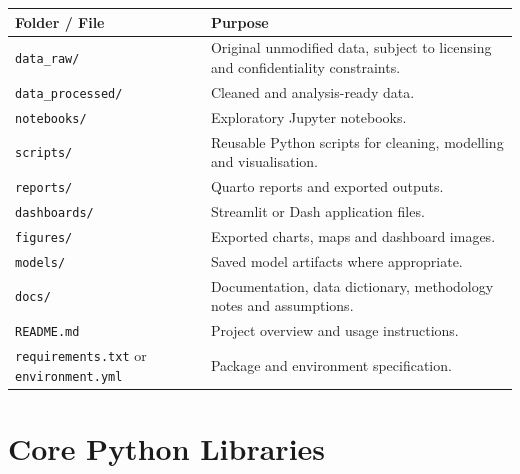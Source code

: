 \documentclass[
  a4paper,
]{article}
\newcounter{none} %
\begin{document}
{\def\LTcaptype{none} %
\begin{longtable}[]{@{}
  >{\raggedright\arraybackslash}p{}
  >{\raggedright\arraybackslash}p{}@{}}
\toprule\noalign{}
\begin{minipage}[b]{\linewidth}\raggedright
Folder / File
\end{minipage} & \begin{minipage}[b]{\linewidth}\raggedright
Purpose
\end{minipage} \\
\midrule\noalign{}
\endhead
\bottomrule\noalign{}
\endlastfoot
\texttt{data\_raw/} & Original unmodified data, subject to licensing and
confidentiality constraints. \\
\texttt{data\_processed/} & Cleaned and analysis-ready data. \\
\texttt{notebooks/} & Exploratory Jupyter notebooks. \\
\texttt{scripts/} & Reusable Python scripts for cleaning, modelling and
visualisation. \\
\texttt{reports/} & Quarto reports and exported outputs. \\
\texttt{dashboards/} & Streamlit or Dash application files. \\
\texttt{figures/} & Exported charts, maps and dashboard images. \\
\texttt{models/} & Saved model artifacts where appropriate. \\
\texttt{docs/} & Documentation, data dictionary, methodology notes and
assumptions. \\
\texttt{README.md} & Project overview and usage instructions. \\
\texttt{requirements.txt} or \texttt{environment.yml} & Package and
environment specification. \\
\end{longtable}
}

\section{Core Python Libraries}\label{core-python-libraries}
\end{document}
